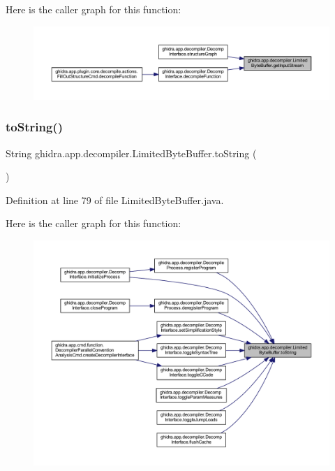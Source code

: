 Here is the caller graph for this function\+:
\nopagebreak
\begin{figure}[H]
\begin{center}
\leavevmode
\includegraphics[width=350pt]{classghidra_1_1app_1_1decompiler_1_1_limited_byte_buffer_af3478c305c9bd3447aff656ba4376d9d_icgraph}
\end{center}
\end{figure}
\mbox{\label{classghidra_1_1app_1_1decompiler_1_1_limited_byte_buffer_a90f56455ddf8428dca1c129102d49697}} 
\subsubsection{\texorpdfstring{toString()}{toString()}}
{\footnotesize\ttfamily String ghidra.\+app.\+decompiler.\+Limited\+Byte\+Buffer.\+to\+String (\begin{DoxyParamCaption}{ }\end{DoxyParamCaption})\hspace{0.3cm}{\ttfamily [inline]}}



Definition at line 79 of file Limited\+Byte\+Buffer.\+java.

Here is the caller graph for this function\+:
\nopagebreak
\begin{figure}[H]
\begin{center}
\leavevmode
\includegraphics[width=350pt]{classghidra_1_1app_1_1decompiler_1_1_limited_byte_buffer_a90f56455ddf8428dca1c129102d49697_icgraph}
\end{center}
\end{figure}


